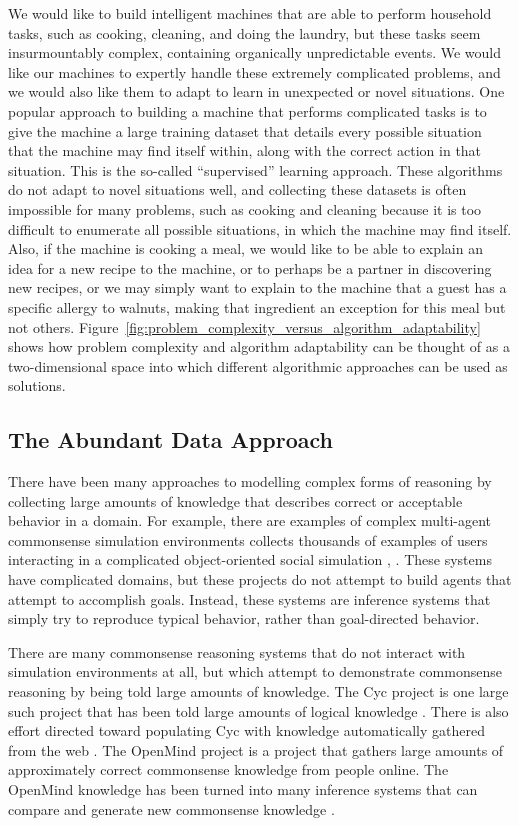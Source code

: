 We would like to build intelligent machines that are able to perform
household tasks, such as cooking, cleaning, and doing the laundry, but
these tasks seem insurmountably complex, containing organically
unpredictable events.  We would like our machines to expertly handle
these extremely complicated problems, and we would also like them to
adapt to learn in unexpected or novel situations.  One popular
approach to building a machine that performs complicated tasks is to
give the machine a large training dataset that details every possible
situation that the machine may find itself within, along with the
correct action in that situation.  This is the so-called
``supervised'' learning approach.  These algorithms do not adapt to
novel situations well, and collecting these datasets is often
impossible for many problems, such as cooking and cleaning because it
is too difficult to enumerate all possible situations, in which the
machine may find itself.  Also, if the machine is cooking a meal, we
would like to be able to explain an idea for a new recipe to the
machine, or to perhaps be a partner in discovering new recipes, or we
may simply want to explain to the machine that a guest has a specific
allergy to walnuts, making that ingredient an exception for this meal
but not others.
Figure~\ref{fig:problem_complexity_versus_algorithm_adaptability}
shows how problem complexity and algorithm adaptability can be thought
of as a two-dimensional space into which different algorithmic
approaches can be used as solutions.

\subsection{The Abundant Data Approach}

There have been many approaches to modelling complex forms of
reasoning by collecting large amounts of knowledge that describes
correct or acceptable behavior in a domain.  For example, there are
examples of complex multi-agent commonsense simulation environments
collects thousands of examples of users interacting in a complicated
object-oriented social simulation \citep{orkin:2009},
\citep{orkin:2010}.  These systems have complicated domains, but these
projects do not attempt to build agents that attempt to accomplish
goals.  Instead, these systems are inference systems that simply try
to reproduce typical behavior, rather than goal-directed behavior.

There are many commonsense reasoning systems that do not interact with
simulation environments at all, but which attempt to demonstrate
commonsense reasoning by being told large amounts of knowledge.  The
Cyc project is one large such project that has been told large amounts
of logical knowledge \citep{lenat:1990}.  There is also effort
directed toward populating Cyc with knowledge automatically gathered
from the web \citep{matuszek:2005}.  The OpenMind project
\citep{singh:2002} is a project that gathers large amounts of
approximately correct commonsense knowledge from people online.  The
OpenMind knowledge has been turned into many inference systems that
can compare and generate new commonsense knowledge \citep{liu:2004a,
  liu:2004b, speer:2009}.

